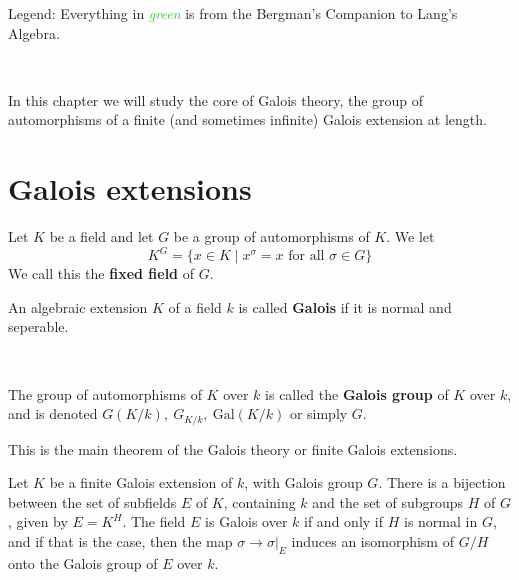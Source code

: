 
\usepackage{thmtools}
\usepackage{makeidx}
\makeindex


\newcommand{\Gal}[1]{\text{Gal}(#1)}
\newcommand{\Bergman}[1]{\textcolor{LimeGreen}{\textit{#1}}}

Legend: Everything in \Bergman{green} is from the Bergman's Companion to Lang's Algebra.

\

In this chapter we will study the core of Galois theory, the group of automorphisms of a finite (and sometimes infinite) Galois extension at length.
    \section{Galois extensions}
\begin{definition}
    Let $K$ be a field and let $G$ be a group of automorphisms of $K$. We let \[K^G = \{x\in K\mid x^\sigma = x \text{ for all }\sigma \in G\}\]We call this the \textbf{fixed field} of $G$. 
\end{definition}

\begin{definition}
    An algebraic extension $K$ of a field $k$ is called \textbf{Galois} if it is normal and seperable.

    \

    The group of automorphisms of $K$ over $k$ is called the \textbf{Galois group} of $K$ over $k$, and is denoted $G(K/k), \ G_{K/k}, \ \Gal{K/k}$ or simply $G$.
\end{definition}

This is the main theorem of the Galois theory or finite Galois extensions.
\begin{theorem}\label{main}
    Let $K$ be a finite Galois extension of $k$, with Galois group $G$. There is a bijection between the set of subfields $E$ of $K$, containing $k$ and the set of subgroups $H$ of $G$, given by $E=K^H$. The field $E$ is Galois over $k$ if and only if $H$ is normal in $G$, and if that is the case, then the map $\sigma\rightarrow \sigma|_E$ induces an isomorphism
    of $G/H$ onto the Galois group of $E$ over $k$.
\end{theorem}

